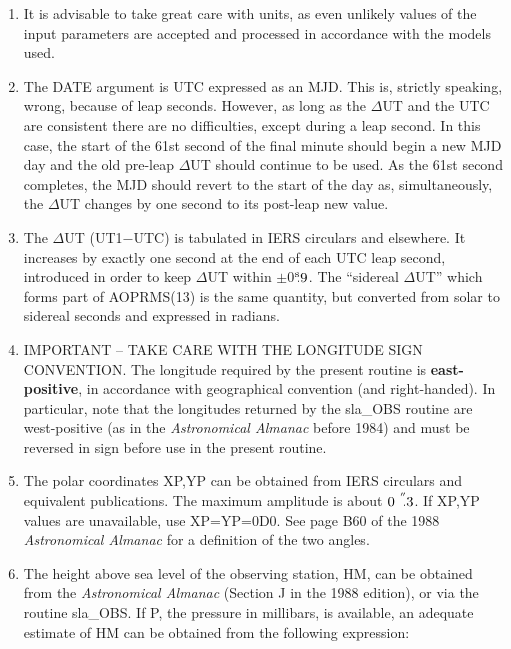 \documentclass[11pt,twoside,nolof]{starlink}
\providecommand{\arcsec}[2] {\arcseci{#1}$\hspace{-0.4em}.#2$}
\providecommand{\arcseci}[1] {$#1\hspace{-0.05em}$\raisebox{-0.5ex}
                         {$^{'\hspace{-0.1em}'}$}}
\providecommand{\tseci}[1]   {$#1$\mbox{$^{\rm s}$}}
\providecommand{\tsec}[2]    {\tseci{#1}$\hspace{-0.3em}.#2$}
\begin{document}
{
 \begin{enumerate}
  \item It is advisable to take great care with units, as even
        unlikely values of the input parameters are accepted and
        processed in accordance with the models used.
  \item The DATE argument is UTC expressed as an MJD.  This is,
        strictly speaking, wrong, because of leap seconds.  However,
        as long as the $\Delta$UT and the UTC are consistent there
        are no difficulties, except during a leap second.  In this
        case, the start of the 61st second of the final minute should
        begin a new MJD day and the old pre-leap $\Delta$UT should
        continue to be used.  As the 61st second completes, the MJD
        should revert to the start of the day as, simultaneously,
        the $\Delta$UT changes by one second to its post-leap new value.
  \item The $\Delta$UT (UT1$-$UTC) is tabulated in IERS circulars and
        elsewhere.  It increases by exactly one second at the end of
        each UTC leap second, introduced in order to keep $\Delta$UT
        within $\pm$\tsec{0}{9}.  The ``sidereal $\Delta$UT'' which forms
        part of AOPRMS(13) is the same quantity, but converted from solar
        to sidereal seconds and expressed in radians.
  \item IMPORTANT -- TAKE CARE WITH THE LONGITUDE SIGN CONVENTION.  The
        longitude required by the present routine is \textbf{east-positive},
        in accordance with geographical convention (and right-handed).
        In particular, note that the longitudes returned by the
        sla\_OBS routine are west-positive (as in the \textit{Astronomical
        Almanac}\/ before 1984) and must be reversed in sign before use in
        the present routine.
  \item The polar coordinates XP,YP can be obtained from IERS
        circulars and equivalent publications.  The
        maximum amplitude is about \arcsec{0}{3}.  If XP,YP values
        are unavailable, use XP=YP=0D0.  See page B60 of the 1988
        \textit{Astronomical Almanac}\/ for a definition of the two angles.
  \item The height above sea level of the observing station, HM,
        can be obtained from the \textit{Astronomical Almanac}\/ (Section J
        in the 1988 edition), or via the routine sla\_OBS.  If P,
        the pressure in millibars, is available, an adequate
        estimate of HM can be obtained from the following expression:

\end{enumerate}}
\end{document}
